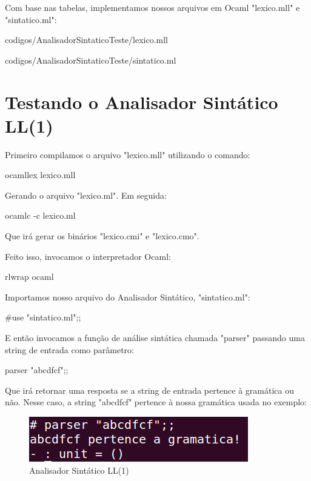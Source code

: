 \documentclass[12pt,a4paper,twoside]{report}
\begin{document}
Com base nas tabelas, implementamos nossos arquivos em Ocaml "lexico.mll" e "sintatico.ml":

 {codigos/AnalisadorSintaticoTeste/lexico.mll}

 {codigos/AnalisadorSintaticoTeste/sintatico.ml}

\section{Testando o Analisador Sintático LL(1)}

Primeiro compilamos o arquivo "lexico.mll" utilizando o comando:

\begin{terminal}
ocamllex lexico.mll
\end{terminal}

Gerando o arquivo "lexico.ml". Em seguida:

\begin{terminal}
ocamlc -c lexico.ml
\end{terminal}

Que irá gerar os binários "lexico.cmi" e "lexico.cmo".

Feito isso, invocamos o interpretador Ocaml:

\begin{terminal}
rlwrap ocaml
\end{terminal}

Importamos nosso arquivo do Analisador Sintático, "sintatico.ml":

\begin{terminal}
#use "sintatico.ml";;
\end{terminal}

E então invocamos a função de análise sintática chamada "parser" passando uma string de entrada como parâmetro:

\begin{terminal}
parser "abcdfcf";;
\end{terminal}

Que irá retornar uma resposta se a string de entrada pertence à gramática ou não. Nesse caso, a string "abcdfcf" pertence à nossa gramática usada no exemplo:

\begin{figure}[!h]
\centering
\caption{Analisador Sintático LL(1)} \label{fig:sintatico}
\includegraphics[scale=0.45]{imagens/sintatico.png}
\end{figure}
\end{document}
